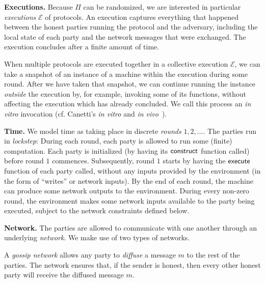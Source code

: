 \noindent
\textbf{Executions.}
Because $\Pi$ can be randomized, we are interested in particular
\emph{executions} $\mathcal{E}$ of protocols. An execution captures
everything that happened between the honest parties running the
protocol and the adversary, including the local state of each
party and the network messages that were exchanged. The execution
concludes after a finite amount of time.

When multiple protocols are executed together in a collective execution
$\mathcal{E}$, we can take a snapshot of an instance of a machine within
the execution during some round. After we have taken that snapshot, we
can continue running the instance \emph{outside} the execution by, for
example, invoking some of its functions, without affecting the execution
which has already concluded. We call this process an \emph{in vitro}
invocation (cf. Canetti's \emph{in vitro} and \emph{in vivo}~\cite{uc}).

\noindent
\textbf{Time.}
We model time as taking place in discrete \emph{rounds} $1, 2, \ldots$.
The parties run in \emph{lockstep}:
During each round, each party is allowed to run some (finite) computation.
Each party is initialized (by having its $\textsf{construct}$ function called)
before round $1$ commences.
Subsequently, round $1$ starts by having the $\textsf{execute}$ function of each
party called, without any inputs provided by the environment (in the form
of ``writes'' or network inputs).
By the end of each round, the machine can produce some network outputs
to the environment. During every non-zero round, the environment
makes some network inputs available to the party being executed,
subject to the network constraints defined below.

\noindent
\textbf{Network.}
The parties are allowed to communicate with one another through an
underlying \emph{network}. We make use of two types of networks.

\begin{definition}
  A \emph{gossip network}
  allows any party to \emph{diffuse} a message $m$ to the rest of the parties.
  The network ensures that, if the sender is honest, then every other honest party
  will receive the diffused message $m$.
\end{definition}

